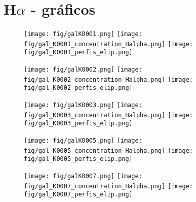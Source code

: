 \chapter{H$\alpha$ - gráficos}
\label{cap01}



\begin{figure}[!ht]
\begin{center}
\setcaptionmargin{1cm}
\texttt{[image: fig/galK0001.png]}
\texttt{[image: fig/gal\_K0001\_concentration\_Halpha.png]}
\texttt{[image: fig/gal\_K0001\_perfis\_elip.png]}
\end{center}
\end{figure}


\begin{figure}[!ht]
\begin{center}
\setcaptionmargin{1cm}
\texttt{[image: fig/galK0002.png]}
\texttt{[image: fig/gal\_K0002\_concentration\_Halpha.png]}
\texttt{[image: fig/gal\_K0002\_perfis\_elip.png]}
\end{center}
\end{figure}


\begin{figure}[!ht]
\begin{center}
\setcaptionmargin{1cm}
\texttt{[image: fig/galK0003.png]}
\texttt{[image: fig/gal\_K0003\_concentration\_Halpha.png]}
\texttt{[image: fig/gal\_K0003\_perfis\_elip.png]}
\end{center}
\end{figure}


\begin{figure}[!ht]
\begin{center}
\setcaptionmargin{1cm}
\texttt{[image: fig/galK0005.png]}
\texttt{[image: fig/gal\_K0005\_concentration\_Halpha.png]}
\texttt{[image: fig/gal\_K0005\_perfis\_elip.png]}
\end{center}
\end{figure}


\begin{figure}[!ht]
\begin{center}
\setcaptionmargin{1cm}
\texttt{[image: fig/galK0007.png]}
\texttt{[image: fig/gal\_K0007\_concentration\_Halpha.png]}
\texttt{[image: fig/gal\_K0007\_perfis\_elip.png]}
\end{center}
\end{figure}


